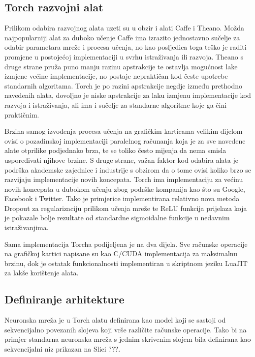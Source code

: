 \documentclass[lmodern, utf8, diplomski, numeric]{fer}
\begin{document}
\subsection{Torch razvojni alat}

Prilikom odabira razvojnog alata uzeti su u obzir i alati Caffe i Theano. Možda najpopularniji alat za duboko učenje Caffe ima izrazito jednostavno sučelje za odabir parametara mreže i procesa učenja, no kao posljedica toga teško je raditi promjene u postojećoj implementaciji u svrhu istraživanja ili razvoja. Theano s druge strane pruža puno manju razinu apstrakcije te ostavlja mogućnost lake izmjene većine implementacije, no postaje nepraktičan kod česte upotrebe standarnih algoritama.
Torch je po razini apstrakcije negdje između prethodno navedenih alata, dovoljno je niske apstrakcije za laku izmjenu implementacije kod razvoja i istraživanja, ali ima i sučelje za standarne algoritme koje ga čini praktičnim. 

Brzina samog izvođenja procesa učenja na grafičkim karticama velikim dijelom ovisi o pozadinskoj implementaciji paralelnog računanja koja je za sve navedene alate otprilike podjednako brza, te se toliko često mijenja da nema smisla uspoređivati njihove brzine. S druge strane, važan faktor kod odabira alata je podrška akademske zajednice i industrije s obzirom da o tome ovisi koliko brzo se razvijaju implementacije novih koncepata. Torch ima implementaciju za većinu novih koncepata u dubokom učenju zbog podrške kompanija kao što su Google, Facebook i Twitter.  Tako je primjerice implementirana relativno nova metoda Dropout za regularizaciju prilikom učenja mreže te ReLU funkcija prijelaza koja je pokazale bolje rezultate od standardne sigmoidalne funkcije u nedavnim istraživanjima.

Sama implementacija Torcha podijeljena je na dva dijela. Sve računske operacije na grafičkoj kartici napisane su kao C/CUDA implementacija za maksimalnu brzinu, dok je ostatak funkcionalnosti implementiran u skriptnom jeziku LuaJIT za lakše korištenje alata.  

\subsection{Definiranje arhitekture}
	
Neuronska mreža je u Torch alatu definirana kao model koji se sastoji od sekvencijalno povezanih slojeva koji vrše različite računske operacije.
Tako bi na primjer standarna neuronska mreža s jednim skrivenim slojem bila definirana kao sekvencijalni niz prikazan na Slici ???. 
\end{document}
